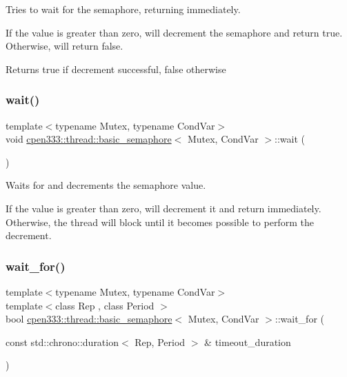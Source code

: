 Tries to wait for the semaphore, returning immediately. 

If the value is greater than zero, will decrement the semaphore and return true. Otherwise, will return false.

\begin{DoxyReturn}{Returns}
true if decrement successful, false otherwise 
\end{DoxyReturn}
\mbox{\label{classcpen333_1_1thread_1_1basic__semaphore_ac5cacef970643d393429ff87c0c6d6bf}} 
\subsubsection{\texorpdfstring{wait()}{wait()}}
{\footnotesize\ttfamily template$<$typename Mutex, typename Cond\+Var$>$ \\
void \hyperlink{classcpen333_1_1thread_1_1basic__semaphore}{cpen333\+::thread\+::basic\+\_\+semaphore}$<$ Mutex, Cond\+Var $>$\+::wait (\begin{DoxyParamCaption}{ }\end{DoxyParamCaption})\hspace{0.3cm}{\ttfamily [inline]}}



Waits for and decrements the semaphore value. 

If the value is greater than zero, will decrement it and return immediately. Otherwise, the thread will block until it becomes possible to perform the decrement. \mbox{\label{classcpen333_1_1thread_1_1basic__semaphore_a500ae89545ae6b639ad347d50a53e2a8}} 
\subsubsection{\texorpdfstring{wait\+\_\+for()}{wait\_for()}}
{\footnotesize\ttfamily template$<$typename Mutex, typename Cond\+Var$>$ \\
template$<$class Rep , class Period $>$ \\
bool \hyperlink{classcpen333_1_1thread_1_1basic__semaphore}{cpen333\+::thread\+::basic\+\_\+semaphore}$<$ Mutex, Cond\+Var $>$\+::wait\+\_\+for (\begin{DoxyParamCaption}\item[{const std\+::chrono\+::duration$<$ Rep, Period $>$ \&}]{timeout\+\_\+duration }\end{DoxyParamCaption})\hspace{0.3cm}{\ttfamily [inline]}}



